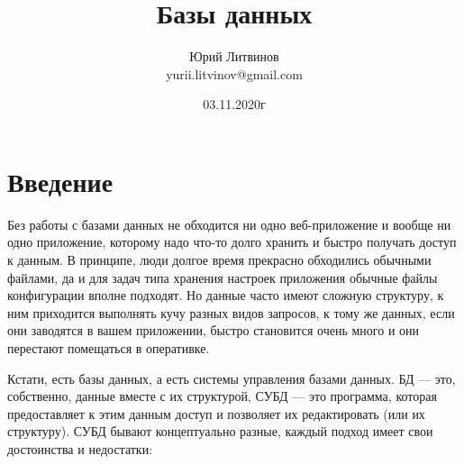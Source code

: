 \documentclass[a5paper]{article}
\title{Базы данных}
\author{Юрий Литвинов\\\small{yurii.litvinov@gmail.com}}
\date{03.11.2020г}
\begin{document}
\maketitle
\thispagestyle{empty}

\section{Введение}

Без работы с базами данных не обходится ни одно веб-приложение и вообще ни одно приложение, которому надо что-то долго хранить и быстро получать доступ к данным. В принципе, люди долгое время прекрасно обходились обычными файлами, да и для задач типа хранения настроек приложения обычные файлы конфигурации вполне подходят. Но данные часто имеют сложную структуру, к ним приходится выполнять кучу разных видов запросов, к тому же данных, если они заводятся в вашем приложении, быстро становится очень много и они перестают помещаться в оперативке.

Кстати, есть базы данных, а есть системы управления базами данных. БД --- это, собственно, данные вместе с их структурой, СУБД --- это программа, которая предоставляет к этим данным доступ и позволяет их редактировать (или их структуру). СУБД бывают концептуально разные, каждый подход имеет свои достоинства и недостатки:
\end{document}
